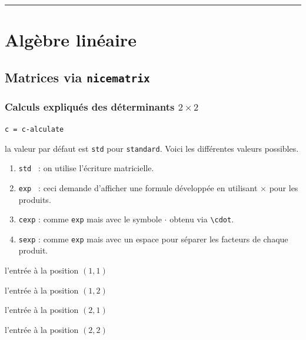 \documentclass[12pt,a4paper]{book}
\newcommand\env[1]{\texttt{#1}}
\newcommand\macro[1]{\env{\textbackslash{}#1}}
\theoremstyle{definition}
\newcommand\separation{
	\medskip
	\hfill\rule{0.5\textwidth}{0.75pt}\hfill
	\medskip
}
\newcommand\extraspace{
	\vspace{0.25em}
}
\newcommand\mwhyprefix[2]{%
	\texttt{#1 = #1-#2}%
}
\begin{document}
{{\separation







\section{Algèbre linéaire}

\subsection{Matrices via \texttt{nicematrix}}

\subsubsection{\texorpdfstring{Calculs expliqués des déterminants $2 \times 2$}%
                           {Calculs expliqués des déterminants 2x2}} 



 \hfill \mwhyprefix{c}{alculate}


\IDoption{} la valeur par défaut est \verb+std+ pour \verb+standard+. Voici les différentes valeurs possibles.
\begin{enumerate}
	\item \verb+std + : on utilise l'écriture matricielle.

	\item \verb+exp + : ceci demande d'afficher une formule développée en utilisant $\times$ pour les produits.

	\item \verb+cexp+ : comme \verb+exp+ mais avec le symbole $\cdot$ obtenu via \macro{cdot}.

	\item \verb+sexp+ : comme \verb+exp+ mais avec un espace pour séparer les facteurs de chaque produit.
\end{enumerate}

 l'entrée à la position $(1, 1)$

 l'entrée à la position $(1, 2)$

\extraspace

 l'entrée à la position $(2, 1)$

 l'entrée à la position $(2, 2)$                   








}}
\end{document}
